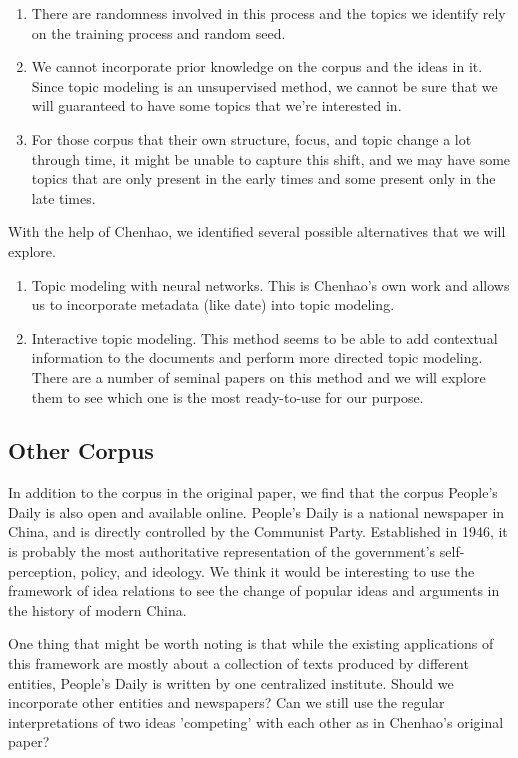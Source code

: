 \documentclass{article}
\begin{document}
\begin{enumerate}
  \item There are randomness involved in this process and the topics we identify rely on the training process and random seed.
  \item We cannot incorporate prior knowledge on the corpus and the ideas in it. Since topic modeling is an unsupervised method, we cannot be sure that we will guaranteed to have some topics that we're interested in. 
  \item For those corpus that their own structure, focus, and topic change a lot through time, it might be unable to capture this shift, and we may have some topics that are only present in the early times and some present only in the late times.
\end{enumerate}

With the help of Chenhao, we identified several possible alternatives that we will explore.

\begin{enumerate}
  \item Topic modeling with neural networks. This is Chenhao's own work and allows us to incorporate metadata (like date) into topic modeling. \cite{chenhao}
  \item Interactive topic modeling. \cite{interactive} This method seems to be able to add contextual information to the documents and perform more directed topic modeling. There are a number of seminal papers on this method and we will explore them to see which one is the most ready-to-use for our purpose. \cite{interactivec} \cite{interactiveb}
\end{enumerate}  



\subsection{Other Corpus}

In addition to the corpus in the original paper, we find that the corpus People's Daily is also open and available online. People's Daily is a national newspaper in China, and is directly controlled by the Communist Party. Established in 1946, it is probably the most authoritative representation of the government's self-perception, policy, and ideology. We think it would be interesting to use the framework of idea relations to see the change of popular ideas and arguments in the history of modern China. 

One thing that might be worth noting is that while the existing applications of this framework are mostly about a collection of texts produced by different entities, People's Daily is written by one centralized institute. Should we incorporate other entities and newspapers? Can we still use the regular interpretations of two ideas 'competing' with each other as in Chenhao's original paper?
\end{document}
